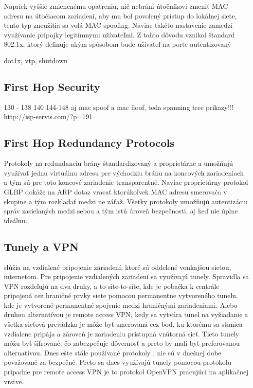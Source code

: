 Napriek vyššie zmienenému opatreniu, nič nebráni útočníkovi zmeniť MAC adresu na útočiacom zariadení, aby mu bol povolený prístup do lokálnej siete, tento typ zneužitia sa volá MAC spoofing. Naviac takéto nastavenie zamedzí využívanie prípojky legitímnymi užívateľmi. Z tohto dôvodu vznikol štandard 802.1x, ktorý definuje akým spôsobom bude užívateľ na porte autentizovaný

dot1x, vtp, shutdown
\subsection*{First Hop Security}
130 - 138 140 144-148 aj mac spoof a mac floof, teda spanning tree prikazy!!!
http://isp-servis.com/?p=191
\subsection*{First Hop Redundancy Protocols}
Protokoly na redundanciu brány štandardizovaný  a proprietárne  a  umožňujú využívať jednu virtuálnu adresu pre východziu bránu na koncových zariadeniach a tým sú pre toto koncové zariadenie transparentné. Naviac proprietárny protokol GLBP dokáže na ARP dotaz vracať ktorúkoľvek MAC adresu smerovača v skupine a tým rozkladať medzi ne záťaž. Všetky protokoly umožňujú autentizáciu správ zasielaných medzi sebou a tým istú úroveň bezpečnosti, aj keď nie úplne ideálnu.  

\subsection*{Tunely a VPN}
 slúžia na vzdialené pripojenie zariadení, ktoré sú oddelené vonkajšou sieťou, internetom. Pre pripojenie vzdialených zariadení sa využívajú tunely. Spravidla sa VPN rozdeľujú na dva druhy, a to site-to-site, kde je pobačka k centrále pripojená cez hraničné prvky siete pomocou permanentne vytvoreného tunelu.  kde je vytvorené permanentné spojenie medzi hraničnými zariadeniami. Alebo druhou alternatívou je remote access VPN, kedy sa vytvára tunel na vyžiadanie a všetka sieťová prevádzka je môže byť smerovaná cez bod, ku ktorému sa stanica vzdialene pripája a zároveň je zariadeniu prístupná vnútorná sieť. Tieto tunely môžu byť šifrované, čo zabezpečuje dôvernosť a preto by mali byť preferovanou alternatívou. Dnes ešte stále používané protokoly ,  nie sú v dnešnej dobe považované za bezpečné. Preto sa dnes využívajú tunely pomocou protokolu  prípadne pre remote access VPN je to protokol OpenVPN pracujúci na aplikačnej vrstve.

